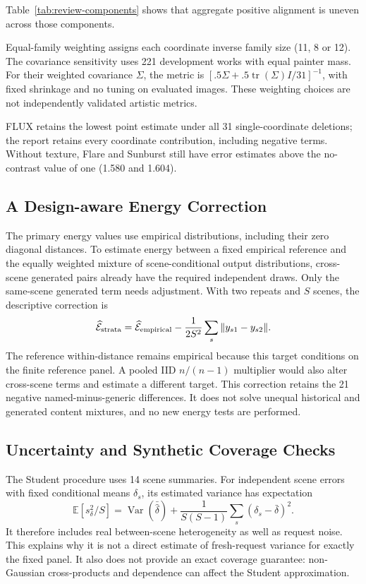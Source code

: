 Table~\ref{tab:review-components} shows that aggregate positive alignment is
uneven across those components.

Equal-family weighting assigns each coordinate inverse family size (11, 8 or 12).
The covariance sensitivity uses 221 development works with equal painter mass.
For their weighted covariance $\Sigma$, the metric is
$[.5\Sigma+.5\operatorname{tr}(\Sigma)I/31]^{-1}$, with fixed shrinkage and no
tuning on evaluated images. These weighting choices are not independently
validated artistic metrics.

\begin{samepage}
FLUX retains the lowest point estimate under all
31 single-coordinate deletions; the report retains every coordinate contribution,
including negative terms.
Without texture, Flare and Sunburst still have error estimates above the
no-contrast value of one (1.580 and 1.604).
\end{samepage}

\subsection{A Design-aware Energy Correction}
The primary energy values use empirical distributions, including their zero
diagonal distances. To estimate energy between a fixed empirical reference
and the equally weighted mixture of scene-conditional output distributions,
cross-scene generated pairs already have the required independent draws.
Only the same-scene generated term needs adjustment. With two repeats and
$S$ scenes, the descriptive correction is
\[
 \widehat{\mathcal E}_{\rm strata}
 =\widehat{\mathcal E}_{\rm empirical}
 -\frac{1}{2S^2}\sum_s\|y_{s1}-y_{s2}\|.
\]
The reference within-distance remains empirical because this target conditions
on the finite reference panel. A pooled IID $n/(n-1)$ multiplier would also
alter cross-scene terms and estimate a different target. This correction retains
the 21 negative named-minus-generic differences. It does not solve unequal
historical and generated content mixtures, and no new energy tests are performed.

\subsection{Uncertainty and Synthetic Coverage Checks}
The Student procedure uses 14 scene summaries. For independent scene errors
with fixed conditional means $\delta_s$, its estimated variance has expectation
\[
 \mathbb E[s_\delta^2/S]
 =\operatorname{Var}(\bar{\widehat\delta})
 +\frac{1}{S(S-1)}\sum_s(\delta_s-\bar\delta)^2.
\]
It therefore includes real between-scene heterogeneity as well as request noise.
This explains why it is not a direct estimate of fresh-request variance for
exactly the fixed panel. It also does not provide an exact coverage guarantee:
non-Gaussian cross-products and dependence can affect the Student approximation.

